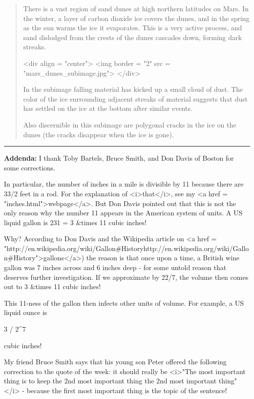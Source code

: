 \begin{quote}

There is a vast region of sand dunes at high northern latitudes on
Mars. In the winter, a layer of carbon dioxide ice covers the dunes,
and in the spring as the sun warms the ice it evaporates. This is a
very active process, and sand dislodged from the crests of the dunes
cascades down, forming dark streaks.

<div align = "center">
<img border = "2" src = "mars_dunes_subimage.jpg">
</div>

In the subimage falling material has kicked up a small cloud of
dust. The color of the ice surrounding adjacent streaks of material
suggests that dust has settled on the ice at the bottom after similar
events.

Also discernible in this subimage are polygonal cracks in the ice on
the dunes (the cracks disappear when the ice is gone).

\end{quote}
    

\par\noindent\rule{\textwidth}{0.4pt}
\textbf{Addenda:} I thank Toby Bartels, Bruce Smith, and Don Davis of
Boston for some corrections.

In particular, the number of inches in a mile is divisible by 11
because there are 33/2 feet in a rod.  For the explanation of
<i>that</i>, see my <a href = "inches.html">webpage</a>.  But Don
Davis pointed out that this is not the only reason why the number 11
appears in the American system of units.  A US liquid gallon is 231 =
3  &times 11 cubic inches!

Why?  According to Don Davis and the Wikipedia article on <a href =
"http://en.wikipedia.org/wiki/Gallon#Historyhttp://en.wikipedia.org/wiki/Gallon#History">gallons</a>)
the reason is that once upon a time, a British wine gallon was 7
inches across and 6 inches deep - for some untold reason that deserves
further investigation.  If we approximate \pi  by 22/7, the volume
then comes out to 3  &times 11 cubic inches!

This 11-ness of the gallon then infects other units of volume.
For example, a US liquid ounce is 

3   / 2^{7}

cubic inches!  

My friend Bruce Smith says that his young son Peter offered the
following correction to the quote of the week: it should really be
<i>"The most important thing is to keep the 2nd most important
thing the 2nd most important thing"</i> - because the first most
important thing is the topic of the sentence!


